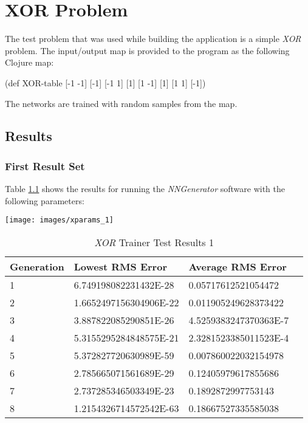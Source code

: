\chapter[XOR Problem]{XOR Problem}
The test problem that was used while building the application is a
simple {\it XOR} problem. 
The input/output map is provided to the program as the following
Clojure map: 

(def XOR-table {[-1 -1] [-1]
                [-1 1] [1]
                [1 -1] [1]
                [1 1] [-1]})

The networks are trained with random samples from the map.

\section{Results}

\subsection{First Result Set}

Table \ref{xor1} shows the results for running the {\it NNGenerator}
software with the following parameters: 

\begin{center}
\texttt{[image: images/xparams\_1]}
\end{center}

\begin{center}
    \begin{longtable}{ | l | l | l | l |}
      \caption{{\it XOR} Trainer Test Results 1} \label{xor1} \\
    \hline
    Generation & Lowest RMS Error & Average RMS Error \\ \hline
1 &	6.749198082231432E-28 &	0.05717612521054472 \\ \hline
2 &	1.6652497156304906E-22 &	0.011905249628373422 \\ \hline
3 &	3.887822085290851E-26 &	4.5259383247370363E-7 \\ \hline
4 &	5.3155295284848575E-21 &	2.3281523385011523E-4 \\ \hline
5 &	5.372827720630989E-59 &	0.007860022032154978 \\ \hline
6 &	2.785665071561689E-29 &	0.12405979617855686 \\ \hline
7 &	2.737285346503349E-23 &	0.1892872997753143 \\ \hline
8 &	1.2154326714572542E-63 &	0.18667527335585038 \\ \hline   
\end{longtable}
\end{center}

